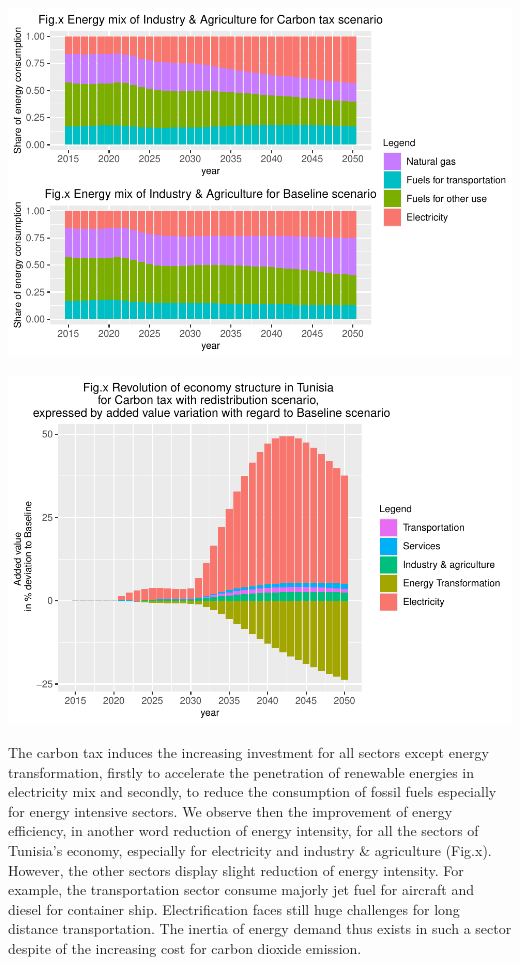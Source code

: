 \documentclass[
]{article}
\begin{document}
\includegraphics{Modele-ThreeMe-Tunisie_Sequeira_Valilou_Wang_files/figure-latex/unnamed-chunk-22-1.pdf}

\includegraphics{Modele-ThreeMe-Tunisie_Sequeira_Valilou_Wang_files/figure-latex/unnamed-chunk-23-1.pdf}

The carbon tax induces the increasing investment for all sectors except
energy transformation, firstly to accelerate the penetration of
renewable energies in electricity mix and secondly, to reduce the
consumption of fossil fuels especially for energy intensive sectors. We
observe then the improvement of energy efficiency, in another word
reduction of energy intensity, for all the sectors of Tunisia's economy,
especially for electricity and industry \& agriculture (Fig.x). However,
the other sectors display slight reduction of energy intensity. For
example, the transportation sector consume majorly jet fuel for aircraft
and diesel for container ship. Electrification faces still huge
challenges for long distance transportation. The inertia of energy
demand thus exists in such a sector despite of the increasing cost for
carbon dioxide emission.
\end{document}

